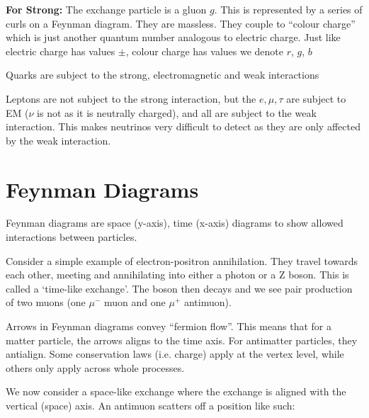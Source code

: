 \textbf{For Strong: } The exchange particle is a gluon $g$. This is represented by a series of curls on a Feynman diagram. They are massless. They couple to ``colour charge'' which is just another quantum number analogous to electric charge. Just like electric charge has values $\pm$, colour charge has values we denote $r$, $g$, $b$

Quarks are subject to the strong, electromagnetic and weak interactions

Leptons are not subject to the strong interaction, but the $e, \mu, \tau$ are subject to EM ($\nu$ is not as it is neutrally charged), and all are subject to the weak interaction. This makes neutrinos very difficult to detect as they are only affected by the weak interaction.

\section{Feynman Diagrams}
Feynman diagrams are space (y-axis), time (x-axis) diagrams to show allowed interactions between particles.

Consider a simple example of electron-positron annihilation. They travel towards each other, meeting and annihilating into either a photon or a Z boson. This is called a `time-like exchange'. The boson then decays and we see pair production of two muons (one $\mu^-$ muon and one $\mu^+$ antimuon).

\begin{center}
\end{center}

Arrows in Feynman diagrams convey ``fermion flow''. This means that for a matter particle, the arrows aligns to the time axis. For antimatter particles, they antialign. Some conservation laws (i.e. charge) apply at the vertex level, while others only apply across whole processes.

We now consider a space-like exchange where the exchange is aligned with the vertical (space) axis. An antimuon scatters off a position like such:

